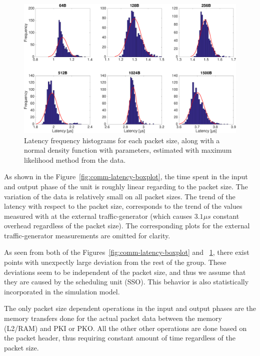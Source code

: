 \begin{figure}[]
  \begin{center}
    \includegraphics[width=\textwidth]{images/comm-latency-histograms.pdf}
    \caption{Latency frequency histograms for each packet size, along with a normal density function with parameters, estimated with maximum likelihood method from the data.}
    \label{fig:comm-latency-histograms}
  \end{center}
\end{figure}

As shown in the Figure~\ref{fig:comm-latency-boxplot}, the time spent in the input and output phase of the unit is roughly linear regarding to the packet size. The variation of the data is relatively small on all packet sizes. The trend of the latency with respect to the packet size, corresponds to the trend of the values measured with at the external traffic-generator (which causes $3.1\mu s$ constant overhead regardless of the packet size). The corresponding plots for the external traffic-generator measurements are omitted for clarity.

As seen from both of the Figures~\ref{fig:comm-latency-boxplot} and ~\ref{fig:comm-latency-histograms}, there exist points with unexpectly large deviation from the rest of the group. These deviations seem to be independent of the packet size, and thus we assume that they are caused by the scheduling unit (SSO). This behavior is also statistically incorporated in the simulation model.

The only packet size dependent operations in the input and output phases are the memory transfers done for the actual packet data between the memory (L2/RAM) and PKI or PKO. All the other other operations are done based on the packet header, thus requiring constant amount of time regardless of the packet size.

